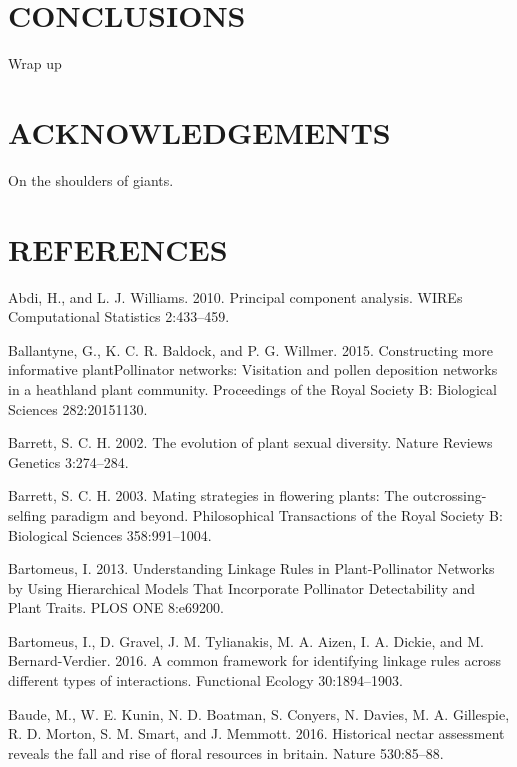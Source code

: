 \documentclass[11pt,a4paper,]{article}
\begin{document}
\section{CONCLUSIONS}\label{conclusions}

Wrap up

\section{ACKNOWLEDGEMENTS}\label{acknowledgements}

On the shoulders of giants.

\section{REFERENCES}\label{references}

\hypertarget{refs}{}
\hypertarget{ref-abdi2010}{}
Abdi, H., and L. J. Williams. 2010. Principal component analysis. WIREs
Computational Statistics 2:433--459.

\hypertarget{ref-ballantyne2015}{}
Ballantyne, G., K. C. R. Baldock, and P. G. Willmer. 2015. Constructing
more informative plantPollinator networks: Visitation and pollen
deposition networks in a heathland plant community. Proceedings of the
Royal Society B: Biological Sciences 282:20151130.

\hypertarget{ref-barrett2002}{}
Barrett, S. C. H. 2002. The evolution of plant sexual diversity. Nature
Reviews Genetics 3:274--284.

\hypertarget{ref-barrett2003}{}
Barrett, S. C. H. 2003. Mating strategies in flowering plants: The
outcrossing-selfing paradigm and beyond. Philosophical Transactions of
the Royal Society B: Biological Sciences 358:991--1004.

\hypertarget{ref-bartomeus2013}{}
Bartomeus, I. 2013. Understanding Linkage Rules in Plant-Pollinator
Networks by Using Hierarchical Models That Incorporate Pollinator
Detectability and Plant Traits. PLOS ONE 8:e69200.

\hypertarget{ref-bartomeus2016}{}
Bartomeus, I., D. Gravel, J. M. Tylianakis, M. A. Aizen, I. A. Dickie,
and M. Bernard-Verdier. 2016. A common framework for identifying linkage
rules across different types of interactions. Functional Ecology
30:1894--1903.

\hypertarget{ref-baude2016}{}
Baude, M., W. E. Kunin, N. D. Boatman, S. Conyers, N. Davies, M. A.
Gillespie, R. D. Morton, S. M. Smart, and J. Memmott. 2016. Historical
nectar assessment reveals the fall and rise of floral resources in
britain. Nature 530:85--88.
\end{document}
